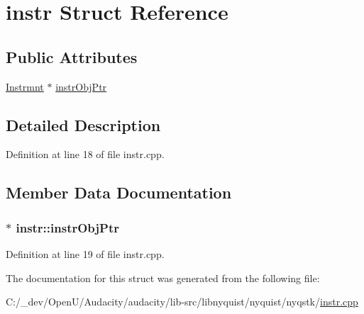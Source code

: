 \hypertarget{structinstr}{}\section{instr Struct Reference}
\label{structinstr}
\subsection*{Public Attributes}
\begin{DoxyCompactItemize}
\item 
\hyperlink{class_nyq_1_1_instrmnt}{Instrmnt} $\ast$ \hyperlink{structinstr_a13ed77738d982fa9a37e556f2eb1a007}{instr\+Obj\+Ptr}
\end{DoxyCompactItemize}


\subsection{Detailed Description}


Definition at line 18 of file instr.\+cpp.



\subsection{Member Data Documentation}
\subsubsection[{\texorpdfstring{instr\+Obj\+Ptr}{instrObjPtr}}]{$\ast$ instr\+::instr\+Obj\+Ptr}\hypertarget{structinstr_a13ed77738d982fa9a37e556f2eb1a007}{}\label{structinstr_a13ed77738d982fa9a37e556f2eb1a007}


Definition at line 19 of file instr.\+cpp.



The documentation for this struct was generated from the following file\+:\begin{DoxyCompactItemize}
\item 
C\+:/\+\_\+dev/\+Open\+U/\+Audacity/audacity/lib-\/src/libnyquist/nyquist/nyqstk/\hyperlink{instr_8cpp}{instr.\+cpp}\end{DoxyCompactItemize}
